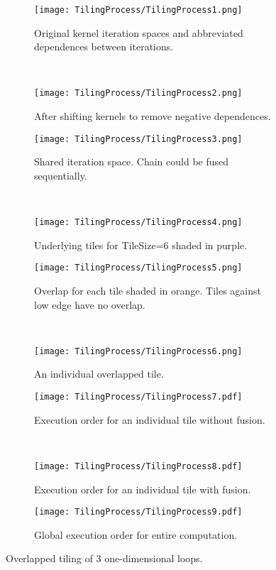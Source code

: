 \begin{figure*}
	\centering

	\begin{subfigure}[t]{0.45\textwidth}
		\centering
		\texttt{[image: TilingProcess/TilingProcess1.png]}
		\caption{Original kernel iteration spaces and abbreviated dependences between iterations.}\label{tiling1}
	\end{subfigure}
	~
	\begin{subfigure}[t]{0.45\textwidth}
		\centering
		\texttt{[image: TilingProcess/TilingProcess2.png]}
		\caption{After shifting kernels to remove negative dependences.}\label{tiling2}
	\end{subfigure}
	\par\bigskip
	\begin{subfigure}[t]{0.45\textwidth}
		\centering
\texttt{[image: TilingProcess/TilingProcess3.png]}
		\caption{Shared iteration space. Chain could be fused sequentially.}\label{tiling3}
	\end{subfigure}
	~
	\begin{subfigure}[t]{0.45\textwidth}
		\centering
		\texttt{[image: TilingProcess/TilingProcess4.png]}
		\caption{Underlying tiles for TileSize=6 shaded in purple.}\label{tiling4}
	\end{subfigure}
	\par\bigskip
	\begin{subfigure}[t]{0.45\textwidth}
		\centering
		\texttt{[image: TilingProcess/TilingProcess5.png]}
		\caption{Overlap for each tile shaded in orange. Tiles against low edge have no overlap.}
	\end{subfigure}
	~
	\begin{subfigure}[t]{0.45\textwidth}
		\centering
		\texttt{[image: TilingProcess/TilingProcess6.png]}
		\caption{An individual overlapped tile.}
	\end{subfigure}
	\par\bigskip
	\begin{subfigure}[t]{0.45\textwidth}
		\centering
		\texttt{[image: TilingProcess/TilingProcess7.pdf]}
		\caption{Execution order for an individual tile without fusion.}\label{tileNofuse}
	\end{subfigure}
	~
	\begin{subfigure}[t]{0.45\textwidth}
		\centering
		\texttt{[image: TilingProcess/TilingProcess8.pdf]}
		\caption{Execution order for an individual tile with fusion.}\label{tileFuse}
	\end{subfigure}
	\par\bigskip
	\begin{subfigure}[t]{\textwidth}
		\centering
		\texttt{[image: TilingProcess/TilingProcess9.pdf]}
		\caption{Global execution order for entire computation.}\label{tiling9}
	\end{subfigure}

\caption{Overlapped tiling of 3 one-dimensional loops.}\label{tilingProcess}
\end{figure*}

